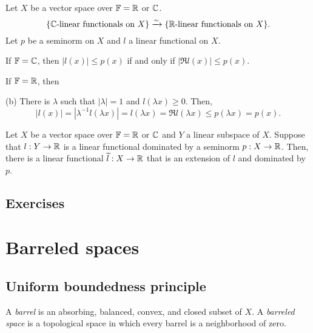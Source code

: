 \documentclass{../note}
\begin{document}
\begin{prb}
Let $X$ be a vector space over $\mathbb{F}=\mathbb{R}$ or $\mathbb{C}$.
\[\{\text{$\mathbb{C}$-linear functionals on $X$}\}\xrightarrow{\sim}\{\text{$\mathbb{R}$-linear functionals on $X$}\}.\]
Let $p$ be a seminorm on $X$ and $l$ a linear functional on $X$.
\begin{parts}
\item
\item If $\mathbb{F}=\mathbb{C}$, then $|l(x)|\le p(x)$ if and only if $|\Re l(x)|\le p(x)$.
\item If $\mathbb{F}=\mathbb{R}$, then
\end{parts}
\end{prb}
\begin{pf}
(b)
There is $\lambda$ such that $|\lambda|=1$ and $l(\lambda x)\ge0$.
Then,
\[|l(x)|=|\lambda^{-1}l(\lambda x)|=l(\lambda x)=\Re l(\lambda x)\le p(\lambda x)=p(x).\]
\end{pf}

\begin{prb}
Let $X$ be a vector space over $\mathbb{F}=\mathbb{R}$ or $\mathbb{C}$ and $Y$ a linear subspace of $X$.
Suppose that $l:Y\to\mathbb{R}$ is a linear functional dominated by a seminorm $p:X\to\mathbb{R}$.
Then, there is a linear functional $\widetilde l:X\to\mathbb{R}$ that is an extension of $l$ and dominated by $p$.
\end{prb}




\section*{Exercises}
\begin{prb}
\end{prb}





\chapter{Barreled spaces}

\section{Uniform boundedness principle}
\begin{prb}
A \emph{barrel} is an absorbing, balanced, convex, and closed subset of $X$.
A \emph{barreled space} is a topological space in which every barrel is a neighborhood of zero.
\end{prb}
\end{document}
